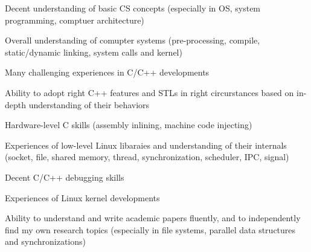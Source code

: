 


\begin{cventries}

\begin{small}
    {
      \begin{cvitems} %
        \item {Decent understanding of basic CS concepts (especially in OS, system programming, comptuer architecture)}
	\item {Overall understanding of comupter systems (pre-processing, compile, static/dynamic linking, system calls and kernel)}
	\item {Many challenging experiences in C/C++ developments}
	\item {Ability to adopt right C++ features and  STLs in right circurstances based on in-depth understanding of their behaviors}
	\item {Hardware-level C skills (assembly inlining, machine code injecting)} 
	\item {Experiences of low-level Linux libaraies and understanding of their internals (socket, file, shared memory, thread, synchronization, scheduler, IPC, signal)}
	\item {Decent C/C++ debugging skills}
	\item {Experiences of Linux kernel developments}
	\item {Ability to understand and write academic papers fluently, and to independently find my own research topics (especially in file systems, parallel data structures and synchronizations)}
	\newline
      \end{cvitems}
    }
\end{small}

\end{cventries}


